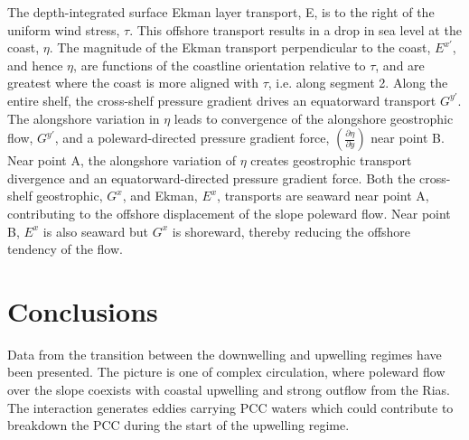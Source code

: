 The depth-integrated surface Ekman layer transport, E, is to the
right of the uniform wind stress, $\tau$. This offshore transport
results in a drop in sea level at the coast, $\eta$. The magnitude
of the Ekman transport perpendicular to the coast, $E^{x'}$, and
hence $\eta$, are functions of the coastline orientation relative
to $\tau$, and are greatest where the coast is more aligned with
$\tau$, i.e. along segment 2. Along the entire shelf, the
cross-shelf pressure gradient drives an equatorward transport
$G^{y'}$. The alongshore variation in $\eta$ leads to convergence
of the alongshore geostrophic flow, $G^{y'}$, and a
poleward-directed pressure gradient force, $(\frac{\partial
\eta}{\partial y})$ near point B. Near point A, the alongshore
variation of $\eta$ creates geostrophic transport divergence and
an equatorward-directed pressure gradient force. Both the
cross-shelf geostrophic, $G^x$, and Ekman, $E^x$, transports are
seaward near point A, contributing to the offshore displacement of
the slope poleward flow. Near point B, $E^x$ is also seaward but
$G^x$ is shoreward, thereby reducing the offshore tendency of the
flow.
\section{Conclusions}
Data from the transition between the downwelling and upwelling
regimes have been presented. The picture is one of complex
circulation, where poleward flow over the slope coexists with
coastal upwelling and strong outflow from the Rias. The
interaction generates eddies carrying PCC waters which could
contribute to breakdown the PCC during the start of the upwelling
regime.

